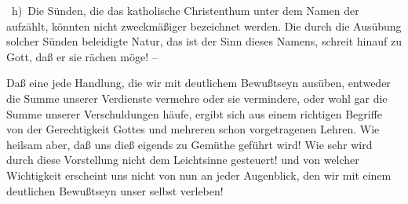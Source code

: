 \begin{aufza}
~h)~Die Sünden, die das katholische Christenthum unter dem Namen der  aufzählt, könnten nicht zweckmäßiger bezeichnet werden. Die durch die Ausübung solcher Sünden beleidigte Natur, das ist der Sinn dieses Namens, schreit hinauf zu Gott, daß er sie rächen möge! --
\item Daß eine jede Handlung, die wir mit deutlichem Bewußtseyn ausüben, entweder die Summe unserer Verdienste vermehre oder sie vermindere, oder wohl gar die Summe unserer Verschuldungen häufe, ergibt sich aus einem richtigen Begriffe von der Gerechtigkeit Gottes und mehreren schon vorgetragenen Lehren. Wie heilsam aber, daß uns dieß eigends zu Gemüthe geführt wird! Wie sehr wird durch diese Vorstellung nicht dem Leichtsinne gesteuert! und von welcher Wichtigkeit erscheint uns nicht von nun an jeder Augenblick, den wir mit einem deutlichen Bewußtseyn unser selbst verleben!~
\end{aufza}


